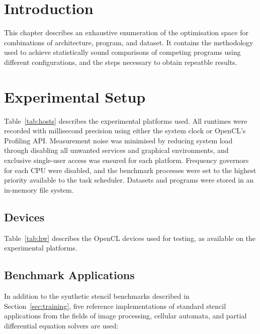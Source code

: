 \section{Introduction}

This chapter describes an exhaustive enumeration of the optimisation
space for  combinations of architecture,
program, and dataset. It contains the methodology used to achieve
statistically sound comparisons of competing programs using different
configurations, and the steps necessary to obtain repeatble results.


\section{Experimental Setup}

\begin{table}

\caption{%
  Specification of experimental platforms.%
}
\label{tab:hosts}
\end{table}

Table~\ref{tab:hosts} describes the experimental platforms used.  All
runtimes were recorded with millisecond precision using either the
system clock or OpenCL's Profiling API. Measurement noise was
minimised by reducing system load through disabling all unwanted
services and graphical environments, and exclusive single-user access
was ensured for each platform. Frequency governors for each CPU were
disabled, and the benchmark processes were set to the highest priority
available to the task scheduler. Datasets and programs were stored in
an in-memory file system.

\subsection{Devices}

\begin{table}

\caption{%
  Specification of experimental OpenCL devices.%
}
\label{tab:hw}
\end{table}

Table~\ref{tab:hw} describes the OpenCL devices used for testing, as
available on the experimental platforms.

\subsection{Benchmark Applications}

In addition to the synthetic stencil benchmarks described in
Section~\ref{sec:training}, five reference implementations of standard
stencil applications from the fields of image processing, cellular
automata, and partial differential equation solvers are used:

